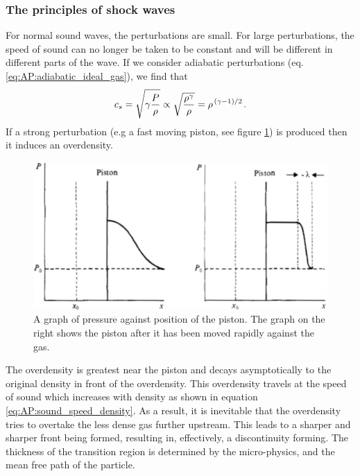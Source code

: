 \subsubsection{The principles of shock waves}
For normal sound waves, the perturbations are small.
 For large perturbations, the speed of sound can no longer be taken to be constant and will be different in different parts of the wave.
 If we consider adiabatic perturbations (eq. \ref{eq:AP:adiabatic_ideal_gas}), we find that
%
\begin{equation}
	c_s = \sqrt{\gamma \frac{P}{\rho}} \propto \sqrt{\frac{\rho ^ \gamma}{\rho}} = \rho ^{\flatfrac{(\gamma - 1)}{2}}.
	\label{eq:AP:sound_speed_density}
\end{equation}
%
If a strong perturbation (e.g a fast moving piston, see figure \ref{fig:AP:shock_piston}) is produced then it induces an overdensity.
\par
%
\begin{minipage}{0.47\textwidth}
	\begin{figure}[H]
		\includegraphics[width = \linewidth]{astro-processes/piston}
		\caption{A graph of pressure against position of the piston.
			 The graph on the right shows the piston after it has been moved rapidly against the gas.}
		\label{fig:AP:shock_piston}
	\end{figure}
\end{minipage}
%
\begin{minipage}{0.47\textwidth}
	The overdensity is greatest near the piston and decays asymptotically to the original density in front of the overdensity.
	 This overdensity travels at the speed of sound which increases with density as shown in equation \ref{eq:AP:sound_speed_density}.
	 As a result, it is inevitable that the overdensity tries to overtake the less dense gas further upstream.
	 This leads to a sharper and sharper front being formed, resulting in, effectively, a discontinuity forming.
	 The thickness of the transition region is determined by the micro-physics, and the mean free path of the particle.
\end{minipage}
